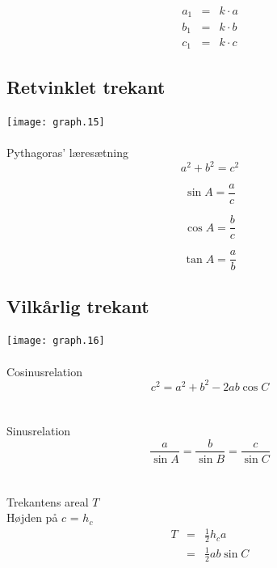 \documentclass[11pt,a5paper,fleqn,leqno]{book}
\begin{document}
\begin{eqnarray}
a_1 & = & k \cdot a \\
b_1 & = & k \cdot b \nonumber \\
c_1 & = & k \cdot c \nonumber
\end{eqnarray}

\vfill

\subsection{Retvinklet trekant}

\texttt{[image: graph.15]}
\\
\\
Pythagoras' læresætning 
\begin{equation}
a^2 + b^2 = c^2
\end{equation}

\begin{equation}
\sin A = \frac{a}{c}
\end{equation}

\begin{equation}
\cos A = \frac{b}{c}
\end{equation}

\begin{equation}
\tan A = \frac{a}{b}
\end{equation}

\vfill

\subsection{Vilkårlig trekant}

\texttt{[image: graph.16]}
\\
\\
Cosinusrelation
\begin{equation}
c^2 = a^2 + b^2 - 2ab\cos C
\end{equation}
\\
\\
Sinusrelation
\begin{equation}
\frac{a}{\sin A} = \frac{b}{\sin B} = \frac{c}{\sin C}
\end{equation}
\\
\\
Trekantens areal $T$ \\
Højden på $c$ = $h_c$
\begin{eqnarray}
T & = & \frac{1}{2}h_c a \\
& = & \frac{1}{2}ab\sin C \nonumber
\end{eqnarray}
\end{document}
